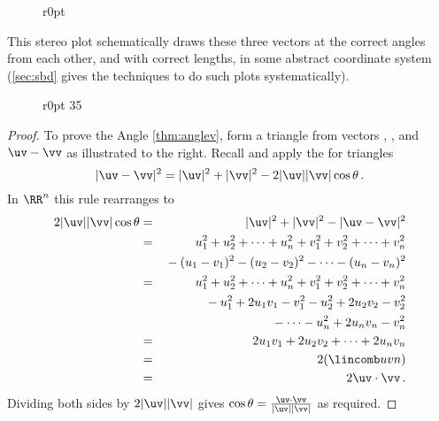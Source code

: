 \begin{example}
\begin{solution}
\begin{itemize}
\end{itemize}
\begin{wrapfigure}[7]r{0pt}
 {
}
\end{wrapfigure}

This stereo plot schematically draws these three vectors at the correct angles from each other, and with correct lengths, in some abstract coordinate system (\cref{sec:sbd} gives the techniques to do such plots systematically).\aqed
\par
\end{solution}
\end{example}


\begin{wrapfigure}r{0pt}
\def\vecopsHook{\node[above] at (axis cs:0,0) {$\qquad\theta$};}
35\end{wrapfigure}
\begin{proof} 
To prove the Angle \cref{thm:anglev}, form a triangle from vectors \uv, \vv, and \(\uv-\vv\) as illustrated to the right.
Recall and apply the  for triangles
\begin{equation*}
|\uv-\vv|^2=|\uv|^2+|\vv|^2-2|\uv||\vv|\cos\theta\,.
\end{equation*}
In \(\RR^n\) this rule rearranges to
\begin{eqnarray*}
2|\uv||\vv|\cos\theta
&=&|\uv|^2+|\vv|^2-|\uv-\vv|^2
\\&=&u_1^2+u_2^2+\cdots+u_n^2
+v_1^2+v_2^2+\cdots+v_n^2
\\&&{}
-(u_1-v_1)^2-(u_2-v_2)^2-\cdots-(u_n-v_n)^2
\\&=&u_1^2+u_2^2+\cdots+u_n^2
+v_1^2+v_2^2+\cdots+v_n^2
\\&&{}
-u_1^2+2u_1v_1-v_1^2-u_2^2+2u_2v_2-v_2^2
\\&&{}
-\cdots-u_n^2+2u_nv_n-v_n^2
\\&=&2u_1v_1+2u_2v_2+\cdots+2u_nv_n
\\&=&2(\lincomb uvn)
\\&=&2\uv\cdot\vv\,.
\end{eqnarray*}
Dividing both sides by \(2|\uv||\vv|\) gives \(\cos\theta=\frac{\uv\cdot\vv}{|\uv||\vv|}\) as required.
\aqed

\end{proof}




